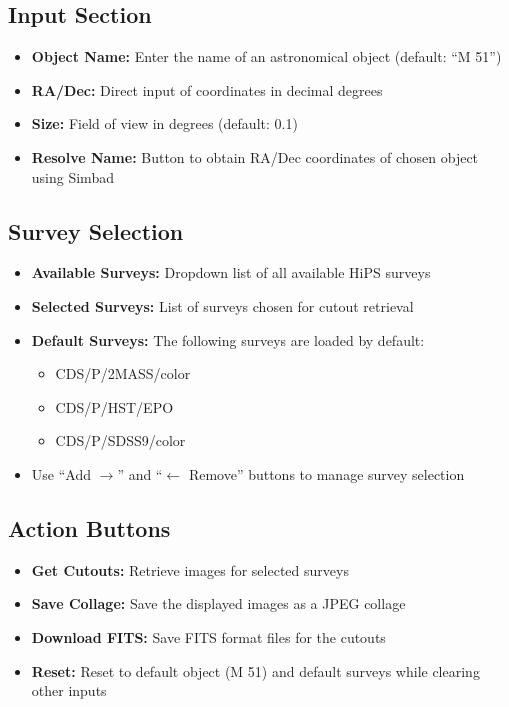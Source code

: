 \documentclass{article}
\begin{document}
\subsection{Input Section}
\begin{itemize}
    \item \textbf{Object Name:} Enter the name of an astronomical object (default: ``M 51'')
    \item \textbf{RA/Dec:} Direct input of coordinates in decimal degrees
    \item \textbf{Size:} Field of view in degrees (default: 0.1)
    \item \textbf{Resolve Name:} Button to obtain RA/Dec coordinates of chosen object using Simbad
\end{itemize}

\subsection{Survey Selection}
\begin{itemize}
    \item \textbf{Available Surveys:} Dropdown list of all available HiPS surveys
    \item \textbf{Selected Surveys:} List of surveys chosen for cutout retrieval
    \item \textbf{Default Surveys:} The following surveys are loaded by default:
        \begin{itemize}
            \item CDS/P/2MASS/color
            \item CDS/P/HST/EPO
            \item CDS/P/SDSS9/color
        \end{itemize}
    \item Use ``Add $\rightarrow$'' and ``$\leftarrow$ Remove'' buttons to manage survey selection
\end{itemize}

\subsection{Action Buttons}
\begin{itemize}
    \item \textbf{Get Cutouts:} Retrieve images for selected surveys
    \item \textbf{Save Collage:} Save the displayed images as a JPEG collage
    \item \textbf{Download FITS:} Save FITS format files for the cutouts
    \item \textbf{Reset:} Reset to default object (M 51) and default surveys while clearing other inputs
\end{itemize}
\end{document}
